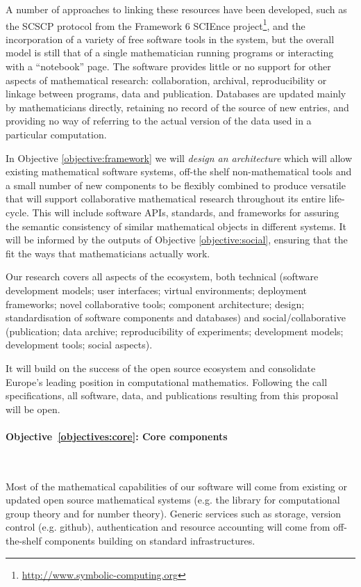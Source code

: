 \documentclass[noworkareas,deliverables,\classoptions]{euproposal}       %
\begin{document}
\begin{proposal}
A number of approaches to linking these resources have been developed,
such as the SCSCP protocol from the Framework 6 SCIEnce
project\footnote{\url{http://www.symbolic-computing.org}}, and the
incorporation of a variety of free software tools in the \Sage system,
but the overall model is still that of a single mathematician running
programs or interacting with a ``notebook'' page. The software
provides little or no support for other aspects of mathematical
research: collaboration, archival, reproducibility or linkage between
programs, data and publication. Databases are updated mainly by
mathematicians directly, retaining no record of the source of new
entries, and providing no way of referring to the actual version of
the data used in a particular computation.

In Objective \ref{objective:framework} we will \emph{design an
  architecture} which will allow existing mathematical software
systems, off-the shelf non-mathematical tools and a small number of new
components to be flexibly combined to produce versatile \VREs that will support
collaborative mathematical research throughout its entire
life-cycle. This will include software APIs, standards, and
frameworks for assuring the semantic consistency of similar
mathematical objects in different systems. It will be informed by the
outputs of Objective \ref{objective:social}, ensuring that the \VREs
fit the ways that mathematicians actually work.

Our research covers all aspects of the ecosystem, both technical
(software development models; user
    interfaces; virtual environments; deployment frameworks; novel
    collaborative tools; component architecture; design; 
    standardisation of software components and databases)
and social/collaborative
(publication; data archive; reproducibility of experiments;
development models; development tools; social aspects). 

It will build on the success of the open source ecosystem and
consolidate Europe's leading position in computational mathematics.
Following the call specifications, all software, data, and
publications resulting from this proposal will be open.

\paragraph{Objective~\ref{objectives:core}: Core components}\

Most of the mathematical capabilities of our software will come
from existing or updated open source mathematical systems (e.g. the
\GAP library for computational group theory and \PariGP for number
theory). Generic services such as storage, version control
(e.g. github), authentication and resource accounting will come from
off-the-shelf components building on standard infrastructures.


\end{proposal}
\end{document}
